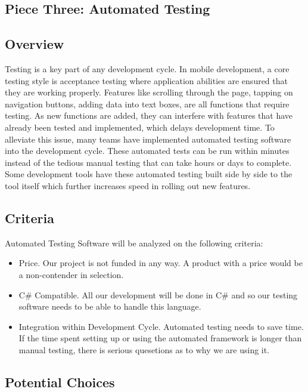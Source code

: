 \documentclass[onecolumn, draftclsnofoot,10pt, compsoc]{IEEEtran}
\begin{document}
\begin{singlespace}
\section{Piece Three: Automated Testing}
\subsection{Overview}
Testing is a  key part of any development cycle. In mobile development, a core testing style is acceptance testing where application abilities are ensured that they are working properly. Features like scrolling through
the page, tapping on navigation buttons, adding data into text boxes, are all functions that require testing. As new functions are added, they can interfere with features that have already been tested and  implemented, which
delays development time. To alleviate this issue, many teams have implemented automated  testing software into the development cycle. These automated  tests can  be run within minutes instead of the tedious manual  testing that
can take hours or days to complete. Some development tools have these automated testing built side by side to the tool itself which further increases speed in rolling out new features.

\subsection{Criteria}
Automated Testing Software will be analyzed on the following criteria:
\begin{itemize}
   	\item Price. Our project is not funded in any way. A product with a price would be a non-contender in selection.
	\item C\# Compatible. All our development will be done in C\# and so our testing software needs to be able to handle this  language.
	\item Integration within Development Cycle. Automated testing needs to save time. If the time spent setting up or using the automated framework is longer than manual testing, there is serious quesetions as to why  we are using it.
\end{itemize}
\subsection{Potential Choices}

\end{singlespace}
\end{document}
